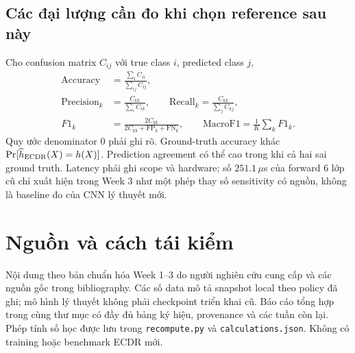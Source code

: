 \documentclass[11pt,a4paper]{article}
\newcommand{\code}[1]{{\small\ttfamily\nolinkurl{#1}}}
\theoremstyle{remark}
\begin{document}
\subsection{Các đại lượng cần đo khi chọn reference sau này}
Cho confusion matrix $C_{ij}$ với true class $i$, predicted class $j$,
\begin{align}
 \mathrm{Accuracy}&=\frac{\sum_i C_{ii}}{\sum_{ij}C_{ij}},\\
 \mathrm{Precision}_k&=\frac{C_{kk}}{\sum_i C_{ik}},\qquad
 \mathrm{Recall}_k=\frac{C_{kk}}{\sum_j C_{kj}},\\
 F1_k&=\frac{2C_{kk}}{2C_{kk}+\mathrm{FP}_k+\mathrm{FN}_k},\qquad
 \mathrm{MacroF1}=\frac1K\sum_kF1_k.
\end{align}
Quy ước denominator 0 phải ghi rõ. Ground-truth accuracy khác
$\Pr[\widehat h_{\rm ECDR}(X)=h(X)]$. Prediction agreement có thể cao trong
khi cả hai sai ground truth. Latency phải ghi scope và hardware; số
$251.1\,\mu$s của forward 6 lớp cũ chỉ xuất hiện trong Week 3 như một phép
thay số sensitivity có nguồn, không là baseline đo của CNN lý thuyết mới.


\section*{Nguồn và cách tái kiểm}
Nội dung theo bản chuẩn hóa Week 1--3 do người nghiên cứu cung cấp và các
nguồn gốc trong bibliography. Các số data mô tả snapshot local theo policy
đã ghi; mô hình lý thuyết không phải checkpoint triển khai cũ. Báo cáo tổng
hợp trong cùng thư mục có đầy đủ bảng ký hiệu, provenance và các tuần còn
lại. Phép tính số học được lưu trong \code{recompute.py} và
\code{calculations.json}. Không có training hoặc benchmark ECDR mới.
\end{document}
